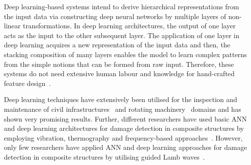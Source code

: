 Deep learning-based systems intend to derive hierarchical representations
from the input data via constructing deep neural networks by multiple layers
of non-linear transformations.
In deep learning architectures, the output of one layer acts as the input to the other subsequent layer.
The application of one layer in deep learning acquires a new representation of the input data and then, the stacking composition of many layers enables the model to learn complex patterns from the simple notions that can be formed from raw input.
Therefore, these systems do not need extensive human labour and knowledge for hand-crafted feature design~\cite{zhao2019deep, yuan2020machine}.

Deep learning techniques have extensively been utilised for the inspection and
maintenance of civil infrastructures~\cite{cha2017deep, lin2017structural, liu2019computer} and rotating machinery~\cite{janssens2016convolutional, jia2016deep} domains and has shown very promising results.
Further, different researchers have used basic ANN and deep learning architectures for damage detection in composite structures by employing vibration, thermography and frequency-based approaches~\cite{islam1994damage, okafor1996delamination, chakraborty2005artificial, khan2019structural, luo2019temporal, bang2020defect}. 
However, only few researchers have applied ANN and deep learning approaches for damage detection in composite structures by utilising guided Lamb waves~\cite{su2004lamb, chetwynd2008damage, de2015application, tabian2019convolutional, feng2019locating}.


